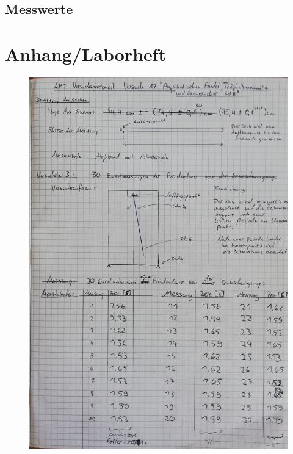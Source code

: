 \documentclass[11pt,a4paper]{article}
\begin{document}
\subsection{Messwerte}



\newpage
\section{Anhang/Laborheft}
\begin{figure}[H]
	\includegraphics[width=1\linewidth]{S1.jpg}
	\centering
\end{figure}
\end{document}
